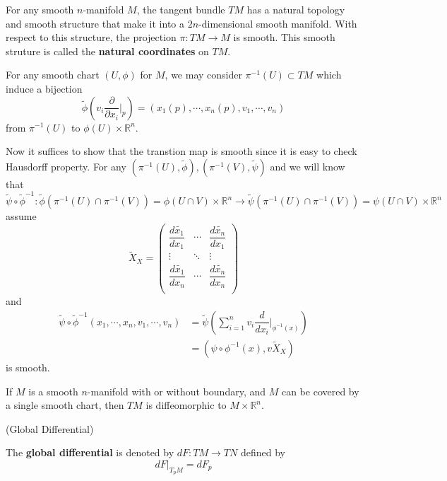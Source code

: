 \begin{proposition}
    For any smooth $n$-manifold $M$, the tangent bundle $TM$ has a natural topology and smooth structure that make it into a $2n$-dimensional smooth manifold. With respect to this structure, the projection $\pi:TM \to M$ is smooth. This smooth struture is called the \textbf{natural coordinates} on $TM$.
\end{proposition}
\Pf\par
    For any smooth chart $(U,\phi)$ for $M$, we may consider $\pi^{-1}(U) \subset TM$ which induce a bijection
    \[
    \tilde{\phi}\left(v_i\dfrac{\partial}{\partial x_i}\Big|_{p}\right) = (x_1(p),\cdots,x_n(p),v_1,\cdots,v_n)
    \]
    from $\pi^{-1}(U)$ to $\phi(U)\times\mathbb{R}^n$.\par
    Now it suffices to show that the transtion map is smooth since it is easy to check Hausdorff property. For any $(\pi^{-1}(U),\tilde{\phi}), (\pi^{-1}(V),\tilde{\psi})$ and we will know that
    \[
    \tilde{\psi}\circ\tilde{\phi}^{-1} : \tilde{\phi}(\pi^{-1}(U)\cap\pi^{-1}(V)) = \phi(U\cap V) \times \mathbb{R}^n \to \tilde{\psi}(\pi^{-1}(U)\cap\pi^{-1}(V)) = \psi (U\cap V) \times \mathbb{R}^n
    \]
    assume
    \[
    \tilde{X}_X =
    \left(\begin{array}{ccc}
        \dfrac{d\widetilde{x_1}}{dx_1} & \cdots & \dfrac{d\widetilde{x_n}}{dx_1} \\
        \vdots & \ddots & \vdots \\
        \dfrac{d\widetilde{x_1}}{dx_n} & \cdots & \dfrac{d\widetilde{x_n}}{dx_n} \\
    \end{array}\right)
    \]
    and
    \[
    \begin{aligned}
        \tilde{\psi}\circ\tilde{\phi}^{-1}(x_1,\cdots,x_n,v_1,\cdots,v_n) &= \tilde{\psi}\left(\sum\limits_{i=1}^n v_i\dfrac{d}{dx_i}\Big|_{\phi^{-1}(x)}\right)\\
        &= (\psi\circ\phi^{-1}(x), v\tilde{X}_X)
    \end{aligned}
    \]
    is smooth.

\begin{proposition}
    If $M$ is a smooth $n$-manifold with or without boundary, and $M$ can be covered by a single smooth chart, then $TM$ is diffeomorphic to $M\times \mathbb{R}^n$.
\end{proposition}

\begin{definition}(Global Differential)\par
    The \textbf{global differential} is denoted by $dF:TM\to TN$ defined by
    \[dF|_{T_pM} = dF_p\]
\end{definition}

